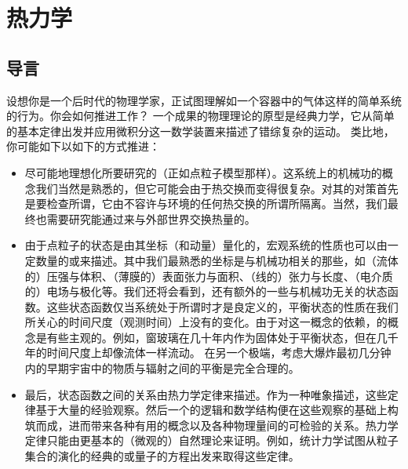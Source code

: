 \chapter{热力学}

\section{导言}


	设想你是一个后时代的物理学家，正试图理解如一个容器中的气体这样的简单系统的行为。你会如何推进工作？
	一个成果的物理理论的原型是经典力学，它从简单的基本定律出发并应用微积分这一数学装置来描述了错综复杂的运动。
	类比地，你可能如下以如下的方式推进：

	\begin{itemize}
		\item 尽可能地理想化所要研究的（正如点粒子模型那样）。这系统上的机械功的概念我们当然是熟悉的，但它可能会由于热交换而变得很复杂。对其的对策首先是要检查所谓，它由不容许与环境的任何热交换的所谓所隔离。当然，我们最终也需要研究能通过来与外部世界交换热量的。
		\item 由于点粒子的状态是由其坐标（和动量）量化的，宏观系统的性质也可以由一定数量的或来描述。其中我们最熟悉的坐标是与机械功相关的那些，如（流体的）压强与体积、（薄膜的）表面张力与面积、（线的）张力与长度、（电介质的）电场与极化等。我们还将会看到，还有额外的一些与机械功无关的状态函数。这些状态函数仅当系统处于所谓时才是良定义的，平衡状态的性质在我们所关心的时间尺度（观测时间）上没有的变化。由于对这一概念的依赖，的概念是有些主观的。例如，窗玻璃在几十年内作为固体处于平衡状态，但在几千年的时间尺度上却像流体一样流动。 在另一个极端，考虑大爆炸最初几分钟内的早期宇宙中的物质与辐射之间的平衡是完全合理的。
		\item 最后，状态函数之间的关系由热力学定律来描述。作为一种唯象描述，这些定律基于大量的经验观察。然后一个的逻辑和数学结构便在这些观察的基础上构筑而成，进而带来各种有用的概念以及各种物理量间的可检验的关系。热力学定律只能由更基本的（微观的）自然理论来证明。例如，统计力学试图从粒子集合的演化的经典的或量子的方程出发来取得这些定律。
	\end{itemize}

